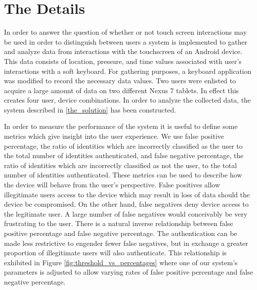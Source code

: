 \section{The Details}
\label{the_details}


In order to answer the question of
whether or not touch screen interactions may be used
in order to distinguish between users
a system is implemented to gather and analyze data
from interactions with the touchscreen of an Android device.
This data consists of location, pressure, and time
values associated with user's interactions with a soft keyboard.
%
For gathering purposes,
a keyboard application was modified to record
the necessary data values.
%
Two users were enlisted to acquire a large 
amount of data on two different Nexus 7 tablets.
In effect this creates four user, device combinations.
%
In order to analyze the collected data,
the system described in \ref{the_solution}
has been constructed.

In order to measure the performance of the system
it is useful to define some metrics
which give insight into the user experience.
%
We use false positive percentage,
the ratio of identities which are incorrectly classified as the user
to the total number of identities authenticated,
and
false negative percentage,
the ratio of identities which are incorrectly classified as not the user,
to the total number of identities authenticated.
%
These metrics can be used to describe how the device will
behave from the user's perspective.
%
False positives allow illegitimate users access to the device
which may result in loss of data should the device be compromised.
%
On the other hand,
false negatives deny device access to the legitimate user.
A large number of false negatives would conceivably 
be very frustrating to the user.
%
There is a natural inverse relationship between
false positive percentage and false negative percentage.
The authentication can be made less restrictive to 
engender fewer false negatives, but
in exchange a greater proportion of
illegitimate users will also authenticate.
%
This relationship is exhibited in Figure \ref{fig:threshold_vs_percentages}
where one of our system's parameters is adjusted to 
allow varying rates 
of false positive percentage and false negative percentage.

